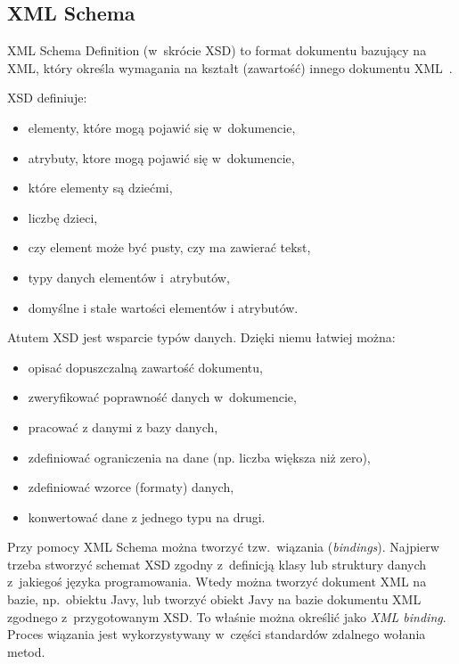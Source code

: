 \subsection{XML Schema}
XML Schema Definition (w~skrócie XSD) to format dokumentu bazujący na XML, który określa wymagania na kształt (zawartość) innego dokumentu XML~\cite{xml-schema-tutorial}.

XSD definiuje:
\begin{itemize}
	\item elementy, które mogą pojawić się w~dokumencie,
	\item atrybuty, ktore mogą pojawić się w~dokumencie,
	\item które elementy są dziećmi,
	\item liczbę dzieci,
	\item czy element może być pusty, czy ma zawierać tekst,
	\item typy danych elementów i~atrybutów,
	\item domyślne i stałe wartości elementów i atrybutów.
\end{itemize}

Atutem XSD jest wsparcie typów danych. Dzięki niemu łatwiej można:
\begin{itemize}
	\item opisać dopuszczalną zawartość dokumentu,
	\item zweryfikować poprawność danych w~dokumencie,
	\item pracować z danymi z bazy danych,
	\item zdefiniować ograniczenia na dane (np. liczba większa niż zero),
	\item zdefiniować wzorce (formaty) danych,
	\item konwertować dane z jednego typu na drugi.
\end{itemize}

Przy pomocy XML Schema można tworzyć tzw.\ wiązania (\emph{bindings}). Najpierw trzeba stworzyć schemat XSD zgodny z~definicją klasy lub struktury danych z~jakiegoś języka programowania. Wtedy można tworzyć dokument XML na bazie, np.\ obiektu Javy, lub tworzyć obiekt Javy na bazie dokumentu XML zgodnego z~przygotowanym XSD. To właśnie można określić jako \emph{XML binding}.
Proces wiązania jest wykorzystywany w~części standardów zdalnego wołania metod.

